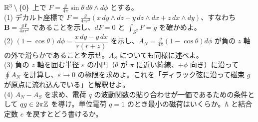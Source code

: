 \begin{problem}[難易度 B]\label{ch05-prob-dirac}
$\mathbb{R}^3\setminus\{0\}$ 上で $F=\frac{g}{4\pi}\sin\theta\,d\theta\wedge d\phi$ とする。\\
(1) デカルト座標で $F=\frac{g}{4\pi r^3}(x\,dy\wedge dz+y\,dz\wedge dx+z\,dx\wedge dy)$、すなわち $\bm B=\frac{g\,\hat{\bm r}}{4\pi r^2}$ であることを示し、$dF=0$ と $\int_{S^2}F=g$ を確かめよ。\\
(2) $(1-\cos\theta)\,d\phi=\dfrac{x\,dy-y\,dx}{r(r+z)}$ を示し、$A_N=\frac{g}{4\pi}(1-\cos\theta)d\phi$ が負の $z$ 軸の外で滑らかであることを示せ。$A_S$ についても同様に述べよ。\\
(3) 負の $z$ 軸を囲む半径 $\varepsilon$ の小円（$\theta$ が $\pi$ に近い緯線、$+\phi$ 向き）に沿って $\oint A_N$ を計算し、$\varepsilon\to0$ の極限を求めよ。これを「ディラック弦に沿って磁束 $g$ が原点に流れ込んでいる」と解釈せよ。\\
(4) $A_N-A_S$ を求め、電荷 $q$ の波動関数の貼り合わせが一価であるための条件として $qg\in2\pi\mathbb{Z}$ を導け。単位電荷 $q=1$ のとき最小の磁荷はいくらか。$\hbar$ と結合定数 $e$ を戻すとどう書けるか。
\end{problem}


